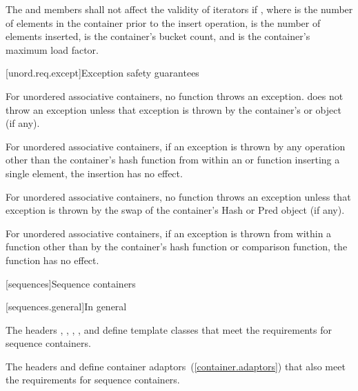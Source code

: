 \pnum
{}%
%
The  and  members shall not affect the validity of iterators if
, where  is the number of elements in
the container prior to the insert operation,  is the
number of elements inserted,  is the container's bucket count, and
 is the container's maximum load factor.

[unord.req.except]{Exception safety guarantees}

\pnum
{}%
%
For unordered associative containers, no  function
throws an exception.  does not throw an
exception unless that exception is thrown by the container's  or
 object (if any).

\pnum
For unordered associative containers, if an exception is thrown by any
operation other than the container's hash function from within an
 or  function inserting a single element,
the insertion has no effect.

\pnum
For unordered associative containers, no  function throws
an exception unless that exception is thrown by the swap of the container's
Hash or Pred object (if any).

\pnum
{}%
%
For unordered associative containers, if an exception is thrown
from within a  function other than by the container's hash
function or comparison function, the  function has no effect.

[sequences]{Sequence containers}

[sequences.general]{In general}

\pnum
The headers , , ,
, and  define template classes that meet the
requirements for sequence containers.

\pnum
The headers  and  define container
adaptors~(\ref{container.adaptors}) that also meet the requirements for
sequence containers.

